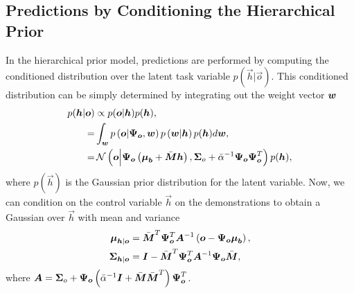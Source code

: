 \subsection{Predictions by Conditioning the Hierarchical Prior}

In the hierarchical prior model, predictions are performed by computing the conditioned distribution over the latent task variable $p(\vec h| \vec o)$. 
This conditioned distribution can be simply determined by integrating out the 
weight vector $\boldsymbol{w} $
\begin{align*}
p(\boldsymbol{h}| \boldsymbol{o}) &\propto p(\boldsymbol{o}|\boldsymbol{h}) p(\boldsymbol{h}), \\
 =& \int_{\boldsymbol{w}} p\left(\boldsymbol{o}\middle|\boldsymbol{\Psi}_{\boldsymbol{o}}, \boldsymbol{w}\right)
    p\left(\boldsymbol{w}\middle|\boldsymbol{h}\right) p(\boldsymbol{h}) d\boldsymbol{w}, \\
 =& \, \mathcal{N}\left(\boldsymbol{o}\middle|\boldsymbol{\Psi}_{\boldsymbol{o}}\left(\boldsymbol{\mu}_{\boldsymbol{b}}  + \bar{\boldsymbol{M}}  \boldsymbol{h}\right),
    \boldsymbol{\Sigma}_o  + \bar{\alpha} ^{-1} \boldsymbol{\Psi}_{\boldsymbol{o}} \boldsymbol{\Psi}_{\boldsymbol{o}}^T\right) p(\boldsymbol{h}),
\end{align*}
where $p(\vec h)$ is the Gaussian prior distribution for the latent variable. 
Now, we can condition on the control variable $\vec h$ on the demonstrations to obtain a Gaussian over $\vec h$ with mean and variance
\begin{align}
 \boldsymbol{\mu}_{\boldsymbol{h}| \boldsymbol{o}} &= \bar{\boldsymbol{M}} ^T \boldsymbol{\Psi}_{\boldsymbol{o}}^T  \boldsymbol{A}^{-1} \left(\boldsymbol{o} - \boldsymbol{\Psi}_{\boldsymbol{o}} \boldsymbol{\mu}_{\boldsymbol{b}}  \right), \label{eq:mu_o_single} \\
 \boldsymbol{\Sigma}_{\boldsymbol{h}|\boldsymbol{o}} &= \boldsymbol{I} - \bar{\boldsymbol{M}} ^T \boldsymbol{\Psi}_{\boldsymbol{o}}^T \boldsymbol{A}^{-1} \boldsymbol{\Psi}_{\boldsymbol{o}} \bar{\boldsymbol{M}}  , \label{eq:sigma_o_single}
\end{align}
where $\boldsymbol{A} = \boldsymbol{\Sigma}_o + \boldsymbol{\Psi}_{\boldsymbol{o}}
\left(\bar{\alpha} ^{-1} \boldsymbol{I} + \bar{\boldsymbol{M}}  \bar{\boldsymbol{M}} ^T \right) \boldsymbol{\Psi}_{\boldsymbol{o}}^T$. 

